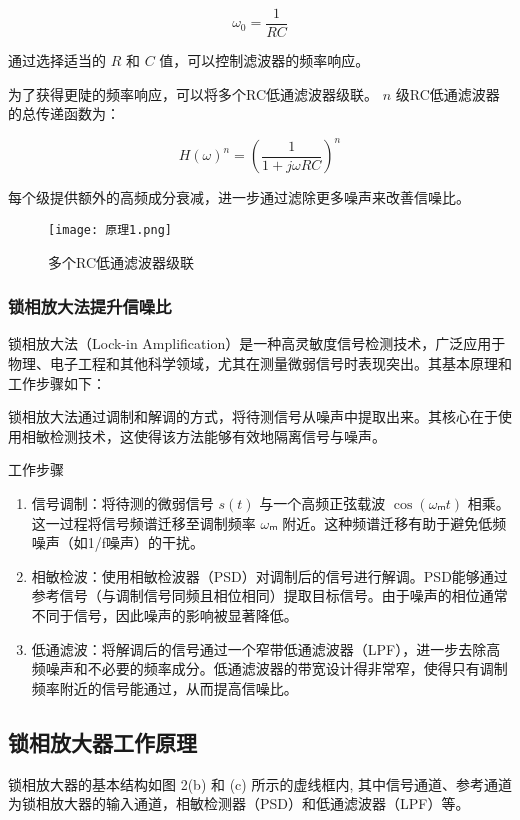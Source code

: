 \documentclass[dvipsnames, svgnames,a4paper,11pt]{article}
\begin{document}
\begin{equation}
\omega_0 = \frac{1}{RC}
\end{equation}

通过选择适当的 \( R \) 和 \( C \) 值，可以控制滤波器的频率响应。


为了获得更陡的频率响应，可以将多个RC低通滤波器级联。 \( n \) 级RC低通滤波器的总传递函数为：

\begin{equation}
H(\omega)^n = \left( \frac{1}{1 + j\omega RC} \right)^n
\end{equation}

每个级提供额外的高频成分衰减，进一步通过滤除更多噪声来改善信噪比。
\begin{figure}[{H}]
	\centering
	\texttt{[image: 原理1.png]}
	\caption{多个RC低通滤波器级联}
	\label{}
\end{figure}
\subsubsection{锁相放大法提升信噪比}
锁相放大法（Lock-in Amplification）是一种高灵敏度信号检测技术，广泛应用于物理、电子工程和其他科学领域，尤其在测量微弱信号时表现突出。其基本原理和工作步骤如下：

锁相放大法通过调制和解调的方式，将待测信号从噪声中提取出来。其核心在于使用相敏检测技术，这使得该方法能够有效地隔离信号与噪声。

工作步骤
\begin{enumerate}
	\item 信号调制：将待测的微弱信号 \( s(t) \) 与一个高频正弦载波 \( \cos(𝜔ₘ t) \) 相乘。这一过程将信号频谱迁移至调制频率 \( 𝜔ₘ \) 附近。这种频谱迁移有助于避免低频噪声（如1/f噪声）的干扰。
	\item 相敏检波：使用相敏检波器（PSD）对调制后的信号进行解调。PSD能够通过参考信号（与调制信号同频且相位相同）提取目标信号。由于噪声的相位通常不同于信号，因此噪声的影响被显著降低。
	\item 低通滤波：将解调后的信号通过一个窄带低通滤波器（LPF），进一步去除高频噪声和不必要的频率成分。低通滤波器的带宽设计得非常窄，使得只有调制频率附近的信号能通过，从而提高信噪比。
\end{enumerate}
\subsection{锁相放大器工作原理}
锁相放大器的基本结构如图 2(b) 和 (c) 所示的虚线框内, 其中信号通道、参考通道为锁相放大器的输入通道，相敏检测器（PSD）和低通滤波器（LPF）等。
\end{document}
